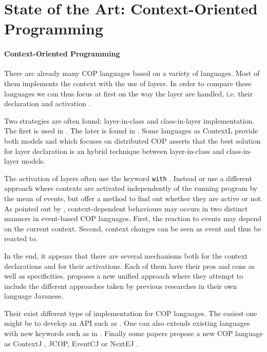 \documentclass[a4paper]{article}
\begin{document}
\section{State of the Art: Context-Oriented Programming}
\label{section:stateoftheart}

\paragraph{Context-Oriented Programming}
There are already many COP languages based on a variety of languages. Most of them implements the context with the use of layers. In order to compare these languages we can thus focus at first on the way the layer are handled, i.e. their declaration and activation \cite{appeltauer_comparison_2009}.

Two strategies are often found: layer-in-class and class-in-layer implementation. The first is used in \cite{appeltauer_declarative_2012} \cite{appeltauer_dedicated_2008} \cite{appeltauer_improving_2009} \cite{kamina_eventcj:_2011} \cite{nunez_declarative_2009}. The later is found in \cite{lincke_open_2011}. Some languages as ContextL provide both models and \cite{ghezzi_context_2010} which focuses on distributed COP asserts that the best solution for layer declaration is an hybrid technique between layer-in-class and class-in-layer models. 

The activation of layers often use the keyword \lstinline|with| \cite{haupt_contextj:_2011} \cite{appeltauer_declarative_2013} \cite{kamina_eventcj:_2011}. Instead \cite{nunez_declarative_2009} or \cite{ghezzi_context_2010} use a different approach where contexts are activated independently of the running program by the mean of events, but offer a method to find out whether they are active or not. As pointed out by \cite{nunez_declarative_2009}, context-dependent behaviours may occurs in two distinct manners in event-based COP languages. First, the reaction to events may depend on the current context. Second, context changes can be seen as event and thus be reacted to. 

In the end, it appears that there are several mechanisms both for the context declarations and for their activations. Each of them have their pros and cons as well as specificities. \cite{kamina_unified_2013} proposes a new unified approach where they attempt to include the different approaches taken by previous researches in their own language Javanese.

Their exist different type of implementation for COP languages. The easiest one might be to develop an API such as \cite{appeltauer_dedicated_2008}. One can also extends existing languages with new keywords such as in \cite{clarke_semantics_2009} \cite{ghezzi_context_2010}. Finally some papers propose a new COP language as ContextJ \cite{haupt_contextj:_2011}, JCOP\cite{appeltauer_declarative_2013}, EventCJ \cite{kamina_eventcj:_2011} or NextEJ \cite{kamina_towards_2009}.
\end{document}
